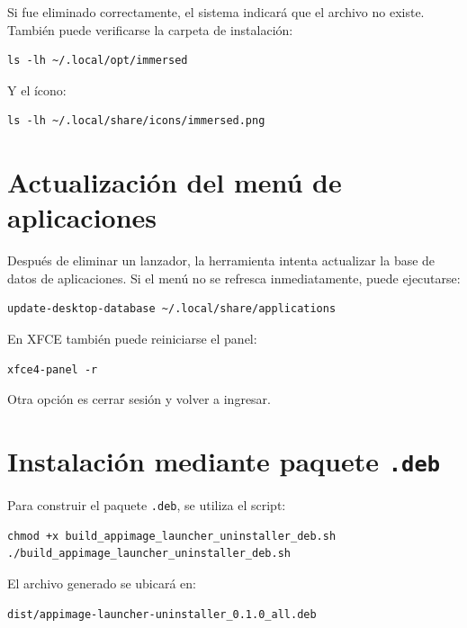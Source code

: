 \documentclass[11pt,a4paper]{article}
\begin{document}
Si fue eliminado correctamente, el sistema indicará que el archivo no existe. También puede verificarse la carpeta de instalación:

\begin{lstlisting}[style=bashstyle]
ls -lh ~/.local/opt/immersed
\end{lstlisting}

Y el ícono:

\begin{lstlisting}[style=bashstyle]
ls -lh ~/.local/share/icons/immersed.png
\end{lstlisting}

\section{Actualización del menú de aplicaciones}

Después de eliminar un lanzador, la herramienta intenta actualizar la base de datos de aplicaciones. Si el menú no se refresca inmediatamente, puede ejecutarse:

\begin{lstlisting}[style=bashstyle]
update-desktop-database ~/.local/share/applications
\end{lstlisting}

En XFCE también puede reiniciarse el panel:

\begin{lstlisting}[style=bashstyle]
xfce4-panel -r
\end{lstlisting}

Otra opción es cerrar sesión y volver a ingresar.

\section{Instalación mediante paquete \texttt{.deb}}

Para construir el paquete \texttt{.deb}, se utiliza el script:

\begin{lstlisting}[style=bashstyle]
chmod +x build_appimage_launcher_uninstaller_deb.sh
./build_appimage_launcher_uninstaller_deb.sh
\end{lstlisting}

El archivo generado se ubicará en:

\begin{lstlisting}[style=textstyle]
dist/appimage-launcher-uninstaller_0.1.0_all.deb
\end{lstlisting}
\end{document}

